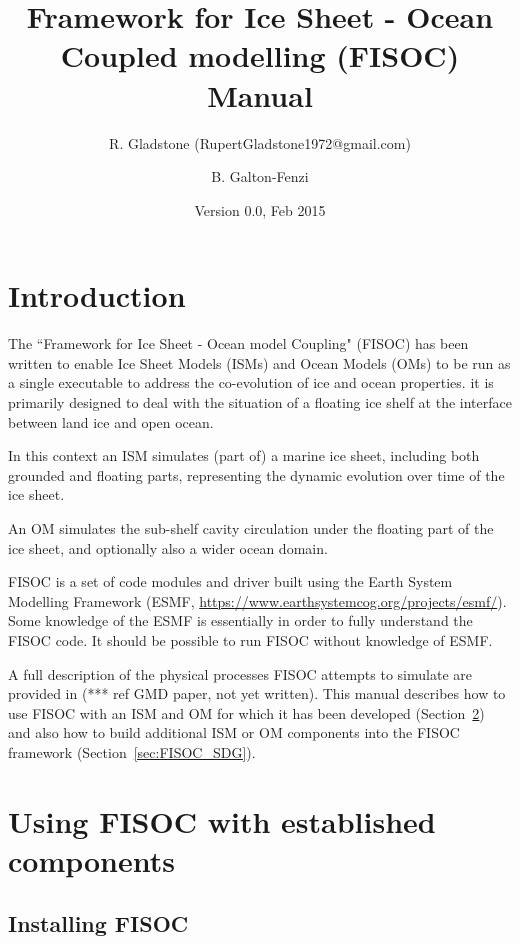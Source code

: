 \documentclass[12pt]{article}
\begin{document}
\title{Framework for Ice Sheet - Ocean Coupled modelling (FISOC) Manual}
\author{R. Gladstone (RupertGladstone1972@gmail.com) \and B. Galton-Fenzi}
\date{Version 0.0, Feb 2015}
\maketitle


\section{Introduction}

The ``Framework for Ice Sheet - Ocean model Coupling" (FISOC) has been written to enable Ice Sheet Models 
(ISMs) and Ocean Models (OMs) to be run as a single executable to address the co-evolution of ice and ocean 
properties.  it is primarily designed to deal with the situation of a floating ice shelf at the interface 
between land ice and open ocean.

In this context an ISM simulates (part of) a marine ice sheet, including both grounded and floating parts, 
representing the dynamic evolution over time of the ice sheet.

An OM simulates the sub-shelf cavity circulation under the floating part of the ice sheet, and optionally also 
a wider ocean domain.

FISOC is a set of code modules and driver built using the Earth System Modelling Framework (ESMF, 
\url{https://www.earthsystemcog.org/projects/esmf/}). 
Some knowledge of the ESMF is essentially in order to fully understand the FISOC code.  It should 
be possible to run FISOC without knowledge of ESMF.

A full description of the physical processes FISOC attempts to simulate are provided in (***
ref GMD paper, not yet written).  
This manual describes how to use FISOC with an ISM and OM for which it has been 
developed (Section~\ref{sec:FISOC_SUG}) and also how to build additional ISM or OM components 
into the FISOC framework (Section~\ref{sec:FISOC_SDG}).




\section{Using FISOC with established components}
\label{sec:FISOC_SUG}

\subsection{Installing FISOC}
\end{document}
